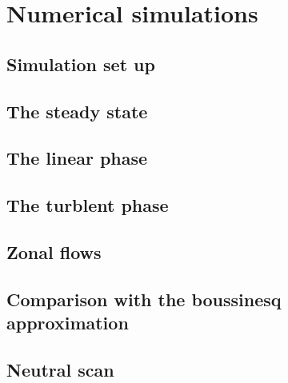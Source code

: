 \documentclass[12pt,a4paper,oneside,openright]{report} %
\begin{document}
% 
% 
% 
% 
% 
% 
% 
% 
%
\part{Numerical simulations}
\label{part:results}

\chapter{Simulation set up}

\chapter{The steady state}

\chapter{The linear phase}

\chapter{The turblent phase}
\label{chap:satTurb}



\chapter{Zonal flows}

\chapter{Comparison with the boussinesq approximation}

\chapter{Neutral scan}

\end{document}
